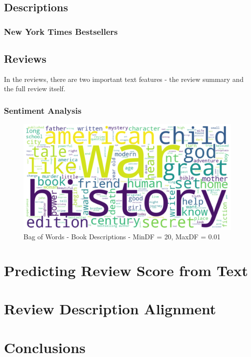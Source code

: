 \documentclass[12pt]{article}
\numberwithin{equation}{section}
\begin{document}
\subsection{Descriptions}

\subsubsection{New York Times Bestsellers}

\subsection{Reviews}
In the reviews, there are two important text features - the review summary and the full review itself.


\subsubsection{Sentiment Analysis}

\begin{figure}
    \centering
    \includegraphics[scale=0.58]{bow_descriptions.png}
    \caption{Bag of Words - Book Descriptions - MinDF = 20, MaxDF = 0.01}
\end{figure}

\section{Predicting Review Score from Text}

\section{Review Description Alignment}

\section{Conclusions}
\vspace{1em} 
\end{document}
